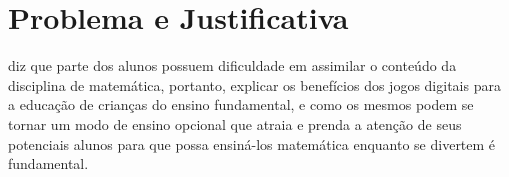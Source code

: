\section{Problema e Justificativa}
\label{justificativa}

  diz que parte dos alunos possuem dificuldade em assimilar o conteúdo da disciplina de matemática, portanto, explicar os benefícios dos jogos digitais para a educação de crianças do ensino fundamental, e como os mesmos podem se tornar um modo de ensino opcional que atraia e prenda a atenção de seus potenciais alunos para que possa ensiná-los matemática enquanto se divertem é fundamental.

